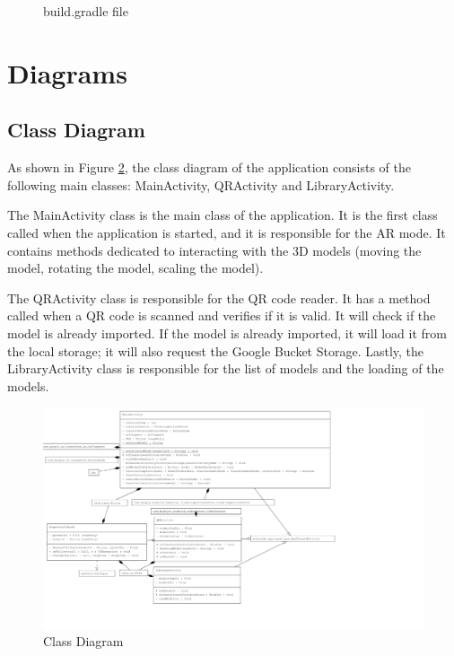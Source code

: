 \begin{figure}[ht]
\begin{minipage}{0.5\textwidth}
\begin{center}
            \caption{build.gradle file}
            \label{fig:Dependencies}
        \end{center}
    \end{minipage}
\end{figure}




\clearpage

\section{Diagrams}
\subsection*{Class Diagram}
As shown in Figure \ref{fig:ClassDiagram}, the class diagram of the application consists of the following main classes: MainActivity, QRActivity and LibraryActivity.
\par
The MainActivity class is the main class of the application. It is the first class called when the application is started, and it is responsible for the \ac{AR} mode. It contains methods dedicated to interacting with the \ac{3D} models (moving the model, rotating the model, scaling the model).
\par
The QRActivity class is responsible for the \ac{QR} code reader. It has a method called when a \ac{QR} code is scanned and verifies if it is valid. It will check if the model is already imported. If the model is already imported, it will load it from the local storage; it will also request the Google Bucket Storage. Lastly, the LibraryActivity class is responsible for the list of models and the loading of the models.
\begin{figure}[ht]
    \centering
    \includegraphics[height=0.9\textwidth]{img/ClassDiagram.png}
    \caption{Class Diagram}
    \label{fig:ClassDiagram}
\end{figure}


